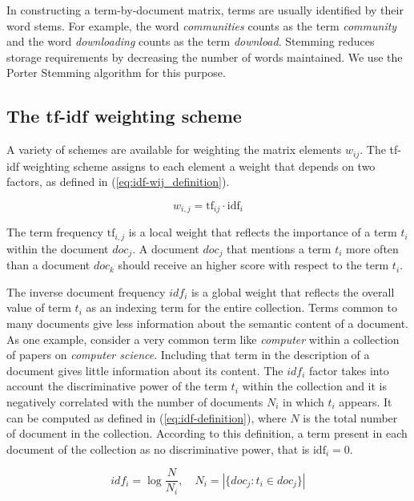 In constructing a term-by-document matrix, terms are usually identified by their word stems. For example, the word \emph{communities} counts as the term \emph{community} and the word \emph{downloading} counts as the term \emph{download}. Stemming reduces storage requirements by decreasing the number of words maintained. We use the Porter Stemming algorithm for this purpose.


\subsection{The tf-idf weighting scheme}
A variety of schemes are available for weighting the matrix elements $w_{ij}$. The tf-idf weighting scheme assigns to each element a weight that depends on two factors, as defined in (\ref{eq:idf-wij_definition}).

\begin{equation}\label{eq:idf-wij_definition}
 w_{i,j} = \mbox{tf}_{ij} \cdot \mbox{idf}_i
\end{equation}

The term frequency $\mbox{tf}_{i,j}$ is a local weight that reflects the importance of a term $t_i$ within the document $doc_j$. A document $doc_j$ that mentions a term $t_i$ more often than a document $doc_k$ should receive an higher score with respect to the term $t_i$.

The inverse document frequency $idf_i$ is a global weight that reflects the overall value of term $t_i$ as an indexing term for the entire collection. Terms common to many documents give less information about the semantic content of a document. As one example, consider a very common term like \emph{computer} within a collection of papers on \emph{computer science}. Including that term in the description of a document gives little information about its content. The $idf_i$ factor takes into account the discriminative power of the term $t_i$ within the collection and it is negatively correlated with the number of documents $N_i$ in which $t_i$ appears. It can be computed as defined in (\ref{eq:idf-definition}), where $N$ is the total number of document in the collection. According to this definition, a term present in each document of the collection as no discriminative power, that is $\mbox{idf}_i = 0$.

\begin{equation}\label{eq:idf-definition}
 idf_i = \log\frac{N}{N_i}, \quad N_i =|\{doc_j : t_i \in doc_j\}|
\end{equation}

